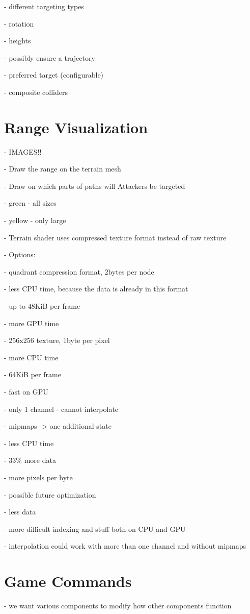 - different targeting types

- rotation

- heights

- possibly ensure a trajectory

- preferred target (configurable)

- composite colliders

\section{Range Visualization}

- IMAGES!!

- Draw the range on the terrain mesh

- Draw on which parts of paths will Attackers be targeted

- green - all sizes

- yellow - only large

- Terrain shader uses compressed texture format instead of raw texture

- Options:

- quadrant compression format, 2bytes per node

- less CPU time, because the data is already in this format

- up to 48KiB per frame

- more GPU time

- 256x256 texture, 1byte per pixel

- more CPU time

- 64KiB per frame

- fast on GPU

- only 1 channel - cannot interpolate

- mipmaps -> one additional state

- less CPU time

- 33\% more data

- more pixels per byte

- possible future optimization

- less data

- more difficult indexing and stuff both on CPU and GPU

- interpolation could work with more than one channel and without mipmaps

\section{Game Commands}

- we want various components to modify how other components function

